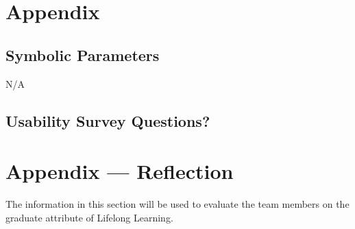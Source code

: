 \documentclass[12pt, titlepage]{article}
\begin{document}
				






\newpage

\section{Appendix} \label{section:6}

\subsection{Symbolic Parameters}  \label{section:6.1}

N/A

\subsection{Usability Survey Questions?} \label{section:6.2}



\newpage{}
\section*{Appendix --- Reflection}


The information in this section will be used to evaluate the team members on the
graduate attribute of Lifelong Learning.


\end{document}
